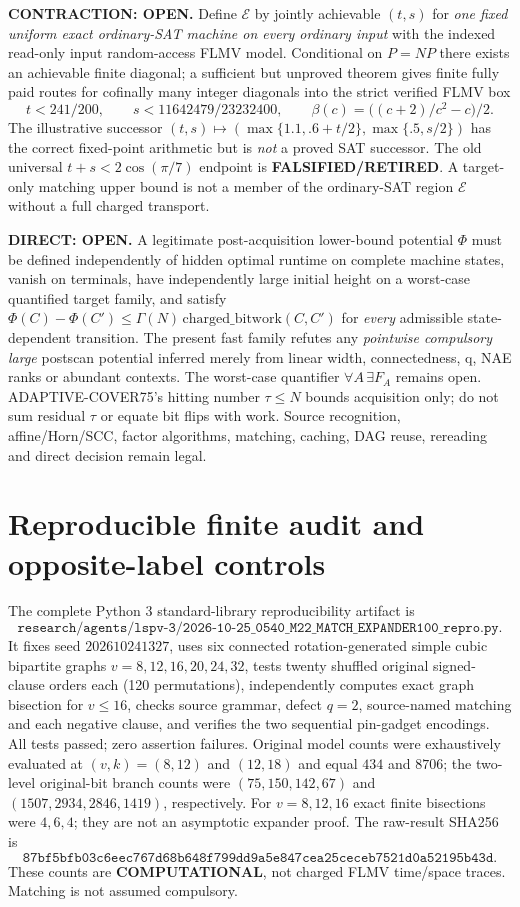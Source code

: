 \documentclass[11pt]{article}
\begin{document}
\noindent\textbf{CONTRACTION: OPEN.} Define $\mathcal E$ by jointly achievable $(t,s)$ for \emph{one fixed uniform exact ordinary-SAT machine on every ordinary input} with the indexed read-only input random-access FLMV model. Conditional on $P=NP$ there exists an achievable finite diagonal; a sufficient but unproved theorem gives finite fully paid routes for cofinally many integer diagonals into the strict verified FLMV box
\[
t<241/200,\qquad s<11642479/23232400,\qquad
\beta(c)=\big((c+2)/c^2-c\big)/2.
\]
The illustrative successor $(t,s)\mapsto(\max\{1.1,.6+t/2\},\max\{.5,s/2\})$ has the correct fixed-point arithmetic but is \emph{not} a proved SAT successor. The old universal $t+s<2\cos(\pi/7)$ endpoint is \textbf{FALSIFIED/RETIRED}. A target-only matching upper bound is not a member of the ordinary-SAT region $\mathcal E$ without a full charged transport.

\noindent\textbf{DIRECT: OPEN.} A legitimate post-acquisition lower-bound potential $\Phi$ must be defined independently of hidden optimal runtime on complete machine states, vanish on terminals, have independently large initial height on a worst-case quantified target family, and satisfy $\Phi(C)-\Phi(C')\le\Gamma(N)\,\mathrm{charged\_bitwork}(C,C')$ for \emph{every} admissible state-dependent transition. The present fast family refutes any \emph{pointwise compulsory large} postscan potential inferred merely from linear width, connectedness, q, NAE ranks or abundant contexts. The worst-case quantifier $\forall A\,\exists F_A$ remains open. ADAPTIVE-COVER75's hitting number $\tau\le N$ bounds acquisition only; do not sum residual $\tau$ or equate bit flips with work. Source recognition, affine/Horn/SCC, factor algorithms, matching, caching, DAG reuse, rereading and direct decision remain legal.

\section{Reproducible finite audit and opposite-label controls}
The complete Python 3 standard-library reproducibility artifact is
\[
\texttt{research/agents/lspv-3/2026-10-25\_0540\_M22\_MATCH\_EXPANDER100\_repro.py}.
\]
It fixes seed $202610241327$, uses six connected rotation-generated simple cubic bipartite graphs $v=8,12,16,20,24,32$, tests twenty shuffled original signed-clause orders each (120 permutations), independently computes exact graph bisection for $v\le16$, checks source grammar, defect $q=2$, source-named matching and each negative clause, and verifies the two sequential pin-gadget encodings. All tests passed; zero assertion failures. Original model counts were exhaustively evaluated at $(v,k)=(8,12)$ and $(12,18)$ and equal $434$ and $8706$; the two-level original-bit branch counts were $(75,150,142,67)$ and $(1507,2934,2846,1419)$, respectively. For $v=8,12,16$ exact finite bisections were $4,6,4$; they are not an asymptotic expander proof. The raw-result SHA256 is
\[
\texttt{87bf5bfb03c6eec767d68b648f799dd9a5e847cea25ceceb7521d0a52195b43d}.
\]
These counts are \textbf{COMPUTATIONAL}, not charged FLMV time/space traces. Matching is not assumed compulsory.
\end{document}
